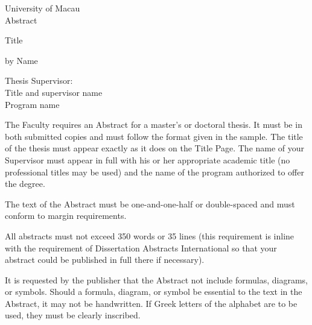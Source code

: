 \newpage
\thispagestyle{empty}
\begin{center}
  \begin{spacing}{2}
    University of Macau\\
    Abstract\\
  \end{spacing}
  Title\\
  \begin{spacing}{2}
    by Name\\
  \end{spacing}
  Thesis Supervisor:\\
  Title and supervisor name\\
  Program name\\
\end{center}
\hphantom{invisible line}
The Faculty requires an Abstract for a master's or doctoral thesis.  It must be in both submitted copies and must follow the format given in the sample. The title of the thesis must appear exactly as it does on the Title Page. The name of your Supervisor must appear in full with his or her appropriate academic title (no professional titles may be used) and the name of the program authorized to offer the degree.

The text of the Abstract must be one-and-one-half or double-spaced and must conform to margin requirements.

All abstracts must not exceed 350 words or 35 lines (this requirement is inline with the requirement of Dissertation Abstracts International so that your abstract could be published in full there if necessary).

It is requested by the publisher that the Abstract not include formulas, diagrams, or symbols. Should a formula, diagram, or symbol be essential to the text in the Abstract, it may not be handwritten. If Greek letters of the alphabet are to be used, they must be clearly inscribed.
